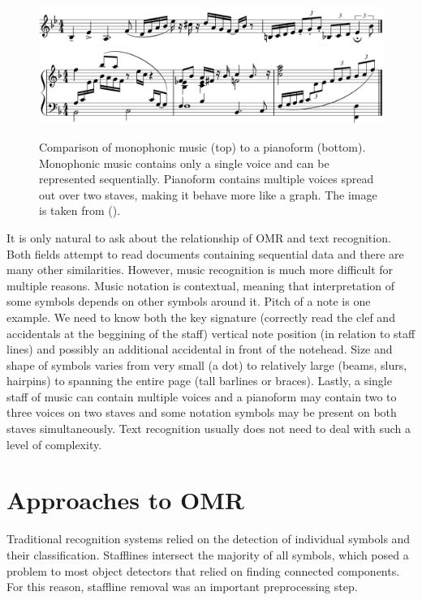 \begin{figure}[ht]
    \centering
    \includegraphics[width=145mm]{../img/music-monophonic.png}
    \includegraphics[width=145mm]{../img/music-pianoform.png}
    \caption{Comparison of monophonic music (top) to a pianoform (bottom). Monophonic music contains only a single voice and can be represented sequentially. Pianoform contains multiple voices spread out over two staves, making it behave more like a graph. The image is taken from (\cite{UnderstandingOmr}).}
    \label{fig:MusicComplexity}
\end{figure}

It is only natural to ask about the relationship of OMR and text recognition. Both fields attempt to read documents containing sequential data and there are many other similarities. However, music recognition is much more difficult for multiple reasons. Music notation is contextual, meaning that interpretation of some symbols depends on other symbols around it. Pitch of a note is one example. We need to know both the key signature (correctly read the clef and accidentals at the beggining of the staff) vertical note position (in relation to staff lines) and possibly an additional accidental in front of the notehead. Size and shape of symbols varies from very small (a dot) to relatively large (beams, slurs, hairpins) to spanning the entire page (tall barlines or braces). Lastly, a single staff of music can contain multiple voices and a pianoform may contain two to three voices on two staves and some notation symbols may be present on both staves simultaneously. Text recognition usually does not need to deal with such a level of complexity.


\section{Approaches to OMR}

Traditional recognition systems relied on the detection of individual symbols and their classification. Stafflines intersect the majority of all symbols, which posed a problem to most object detectors that relied on finding connected components. For this reason, staffline removal was an important preprocessing step.

